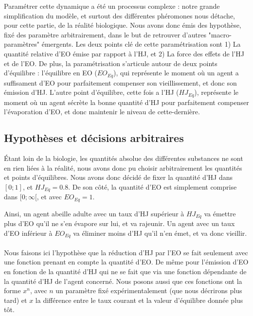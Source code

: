 	Paramétrer cette dynamique a été un processus complexe : notre grande simplification du modèle, et surtout des différentes phéromones nous détache, pour cette partie, de la réalité biologique. Nous avons donc émis des hypothèse, fixé des paramètre arbitrairement, dans le but de retrouver d'autres "macro-paramètres" émergents. Les deux points clé de cette paramétrisation sont 1) La quantité relative d'EO émise par rapport à l'HJ, et 2) La force des effets de l'HJ et de l'EO. De plus, la paramétrisation s'articule autour de deux points d'équilibre : l'équilibre en EO ($EO_{Eq}$), qui représente le moment où un agent a suffisament d'EO pour parfaitement compenser son vieillissement, et donc son émission d'HJ. L'autre point d'équilibre, cette fois a l'HJ ($HJ_{Eq}$), représente le moment où un agent sécrète la bonne quantité d'HJ pour parfaitement compenser l'évaporation d'EO, et donc maintenir le niveau de cette-dernière.
	
	\subsection{Hypothèses et décisions arbitraires}
	Étant loin de la biologie, les quantités absolue des différentes substances ne sont en rien liées à la réalité, nous avons donc pu choisir arbitrairement les quantités et points d'équilibres. Nous avons donc décidé de fixer la quantité d'HJ dans $[0;1]$, et $HJ_{Eq} = 0.8$. De son côté, la quantité d'EO est simplement comprise dans $[0;\infty[$, et avec $EO_{Eq} = 1$. 
	
	Ainsi, un agent abeille adulte avec un taux d'HJ supérieur à $HJ_{Eq}$ va émettre plus d'EO qu'il ne s'en évapore sur lui, et va rajeunir. Un agent avec un taux d'EO inférieur à $EO_{Eq}$ va éliminer moins d'HJ qu'il n'en émet, et va donc vieillir.
	
	\paragraph{}
	Nous faisons ici l'hypothèse que la réduction d'HJ par l'EO se fait seulement avec une fonction prenant en compte la quantité d'EO. De même pour l'émission d'EO en fonction de la quantité d'HJ qui ne se fait que via une fonction dépendante de la quantité d'HJ de l'agent concerné. Nous posons aussi que ces fonctions ont la forme $x^n$, avec $n$ un paramètre fixé expérimentalement (que nous décrirons plus tard) et $x$ la différence entre le taux courant et la valeur d'équilibre donnée plus tôt.
	
